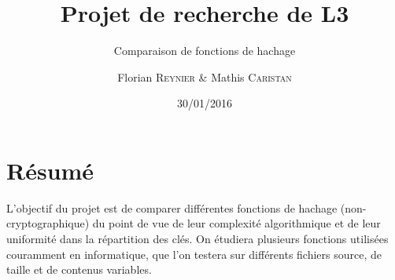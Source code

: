 \documentclass[final,twoside,article,10pt]{scrartcl}
\begin{document}
%
\title{Projet de recherche de L3}
\subtitle{Comparaison de fonctions de hachage}
\author{Florian \textsc{Reynier} \& Mathis \textsc{Caristan}}
%
\date{30/01/2016}

\maketitle

\section*{Résumé }
	\label{sec:resume}
	L'objectif du projet est de comparer différentes fonctions de hachage (non-cryptographique) du point de vue de leur complexité algorithmique et de leur uniformité dans la répartition des clés. On étudiera plusieurs fonctions utilisées couramment en informatique, que l'on testera sur différents fichiers source, de taille et de contenus variables.
	
	
\end{document}
